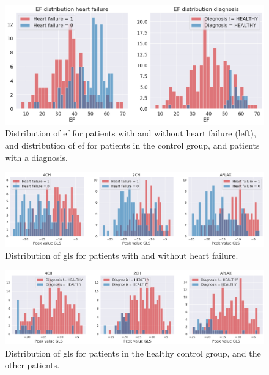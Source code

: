 \begin{figure}[h]
    \begin{center}
    \includegraphics[width=\textwidth]{data-exp/EF_HF_ind_dist.png}
    \end{center}
    \caption{Distribution of \acrshort{ef} for patients with and without heart failure (left), and distribution of \acrshort{ef} for patients in the control group, and patients with a diagnosis.}
    \label{fig:ef_hf_ind_dist}
\end{figure}

\begin{figure}[h]
    \begin{center}
    \includegraphics[width=\textwidth]{data-exp/gls_hf_dist.png}
    \end{center}
    \caption{Distribution of \acrshort{gls} for patients with and without heart failure.}
    \label{fig:gls_hf_dist}
\end{figure}

\begin{figure}[!h]
    \begin{center}
    \includegraphics[width=\textwidth]{data-exp/gls_indication_dist.png}
    \end{center}
    \caption{Distribution of \acrshort{gls} for patients in the healthy control group, and the other patients.}
    \label{fig:gls_ind_dist}
\end{figure}


